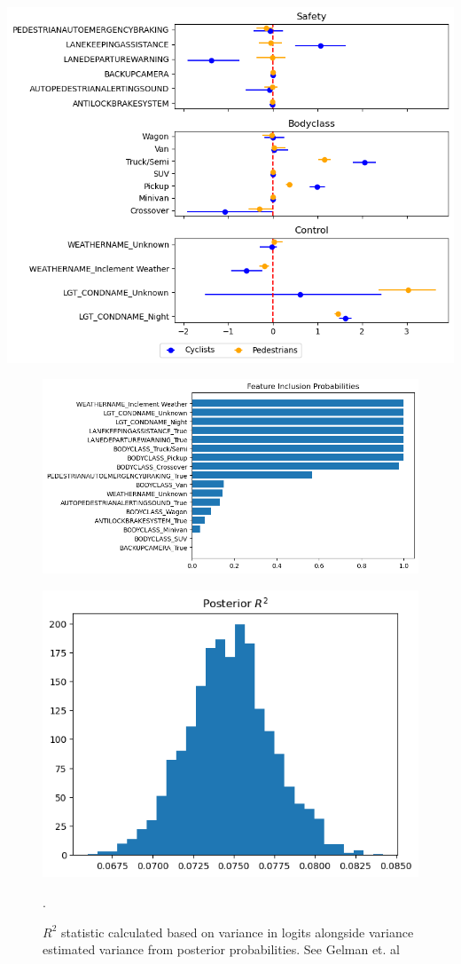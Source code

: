 \documentclass{beamer}
\begin{document}
\begin{frame}
    \centering
    \includegraphics[width=0.9\linewidth]{paper/images/feature_coefficients.png}
\end{frame}

\begin{frame}
\begin{figure}
    \centering
    \includegraphics[width=\linewidth]{paper/images/inclusion_probs.png}
\end{figure}
\end{frame}

\begin{frame}
    \begin{figure}
     \includegraphics[width=0.7\linewidth]{paper/images/R2_dist.png}
    \centering
    \caption{$R^2$ statistic calculated based on variance in logits alongside variance estimated variance from posterior probabilities. See Gelman et. al\cite{gelman_r-squared_2019}}.
    \label{fig:r2-dist}
    \end{figure}
\end{frame}
\end{document}
